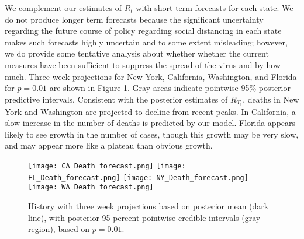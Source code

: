 \documentclass[11pt]{article}
\theoremstyle{plain}
\newcommand{\1}{\mathbf 1}
\begin{document}
We  complement our estimates of $R_t$ with short term forecasts for each state. We do not produce longer term forecasts because the significant uncertainty regarding the future course of policy regarding social distancing in each state makes such forecasts highly uncertain and to some extent misleading; however, we do provide some tentative analysis about whether whether the current measures have been sufficient to suppress the spread of the virus and by how much. Three week projections for New York, California, Washington, and Florida for $p= 0.01$ are shown in Figure \ref{fig:forecasts}. Gray areas indicate pointwise 95\% posterior predictive intervals. Consistent with the posterior estimates of $R_{T_1}$, deaths in New York and Washington are projected to decline from recent peaks. In California, a slow increase in the number of deaths is predicted by our model. Florida appears likely to see growth in the number of cases, though this growth may be very slow, and may appear more like a plateau than obvious growth. 


\begin{figure}[h]
\texttt{[image: CA\_Death\_forecast.png]}
\texttt{[image: FL\_Death\_forecast.png]}
\texttt{[image: NY\_Death\_forecast.png]}
\texttt{[image: WA\_Death\_forecast.png]}
\caption{History with three week projections based on posterior mean (dark line), with posterior 95 percent pointwise credible intervals (gray region), based on $p=0.01$. \label{fig:forecasts}}
\end{figure}














\end{document}
